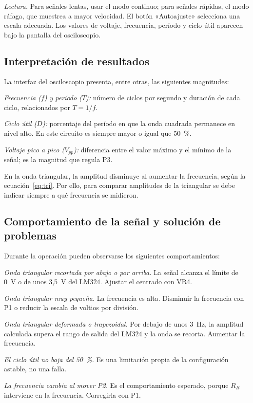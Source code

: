 \documentclass[conference]{IEEEtran}
\begin{document}
\textit{Lectura.} Para señales lentas, usar el modo continuo; para señales rápidas, el modo ráfaga, que muestrea a mayor velocidad. El botón «Autoajuste» selecciona una escala adecuada. Los valores de voltaje, frecuencia, período y ciclo útil aparecen bajo la pantalla del osciloscopio.

\subsection{Interpretación de resultados}

La interfaz del osciloscopio presenta, entre otras, las siguientes magnitudes:

\textit{Frecuencia ($f$) y período ($T$):} número de ciclos por segundo y duración de cada ciclo, relacionados por $T = 1/f$.

\textit{Ciclo útil ($D$):} porcentaje del período en que la onda cuadrada permanece en nivel alto. En este circuito es siempre mayor o igual que 50~\%.

\textit{Voltaje pico a pico ($V_{pp}$):} diferencia entre el valor máximo y el mínimo de la señal; es la magnitud que regula P3.

En la onda triangular, la amplitud disminuye al aumentar la frecuencia, según la ecuación~\eqref{eq:tri}. Por ello, para comparar amplitudes de la triangular se debe indicar siempre a qué frecuencia se midieron.

\subsection{Comportamiento de la señal y solución de problemas}

Durante la operación pueden observarse los siguientes comportamientos:

\textit{Onda triangular recortada por abajo o por arriba.} La señal alcanza el límite de 0~V o de unos 3,5~V del LM324. Ajustar el centrado con VR4.

\textit{Onda triangular muy pequeña.} La frecuencia es alta. Disminuir la frecuencia con P1 o reducir la escala de voltios por división.

\textit{Onda triangular deformada o trapezoidal.} Por debajo de unos 3~Hz, la amplitud calculada supera el rango de salida del LM324 y la onda se recorta. Aumentar la frecuencia.

\textit{El ciclo útil no baja del 50~\%.} Es una limitación propia de la configuración astable, no una falla.

\textit{La frecuencia cambia al mover P2.} Es el comportamiento esperado, porque $R_B$ interviene en la frecuencia. Corregirla con P1.
\end{document}
